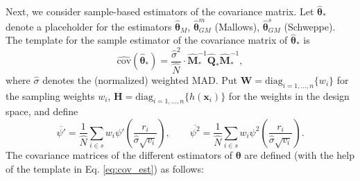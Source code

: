 \documentclass[a4paper,11pt]{scrreprt}
\theoremstyle{remark}
\begin{document}
Next, we consider sample-based estimators of the covariance matrix. Let $\widehat{\bm \theta}_{*}$ denote a placeholder for the estimators $\widehat{\bm \theta}_M$, $\widehat{\bm \theta}_{GM}^{m}$ (Mallows), $\widehat{\bm \theta}_{GM}^{s}$ (Schweppe). The template for the sample estimator of the covariance matrix of $\widehat{\bm \theta}_{*}$ is 
\begin{equation}\label{eq:cov_est}
   \widehat{\mathrm{cov}}(\widehat{\bm \theta}_{*}) = \frac{\widehat{\sigma}^2}{\widehat{N}} \cdot \widehat{\bm M}_{*}^{-1} \widehat{\bm Q}_{*} \widehat{\bm M}_{*}^{-1},
\end{equation}
\noindent where $\widehat{\sigma}$ denotes the (normalized) weighted MAD. Put $\bm W = \mathrm{diag}_{i=1,\ldots,n}\{w_i\}$ for the sampling weights $w_i$, $\bm H = \mathrm{diag}_{i=1,\ldots,n}\{h(\bm x_i)\}$ for the weights in the design space, and define
\begin{equation*}
   \overline{\psi'} = \frac{1}{\widehat{N}}\sum_{i \in s} w_i \psi' \left( \frac{r_i}{\widehat{\sigma} \sqrt{v_i}} \right), \qquad \overline{\psi^2} = \frac{1}{\widehat{N}}\sum_{i \in s} w_i \psi^2 \left( \frac{r_i}{\widehat{\sigma} \sqrt{v_i}} \right).
\end{equation*}
\noindent The covariance matrices of the different estimators of $\bm \theta$ are defined (with the help of the template in Eq. \ref{eq:cov_est}) as follows: 
\end{document}
